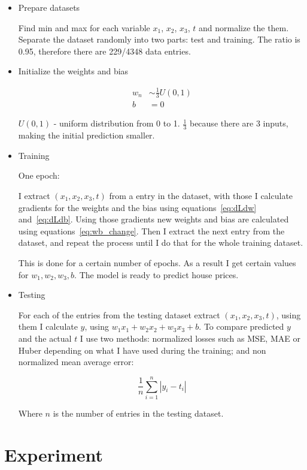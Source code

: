\documentclass{article}
\begin{document}
\begin{itemize}
    \item Prepare datasets

Find min and max for each variable $x_1$, $x_2$, $x_3$, $t$ and normalize the them.
Separate the dataset randomly into two parts: test and training. The ratio is
0.95, therefore there are 229/4348 data entries.


    \item Initialize the weights and bias

\[
\begin{split}
w_n &\sim \frac{1}{3} U(0, 1) \\
b &= 0
\end{split}
\]

$U(0, 1)$ - uniform distribution from 0 to 1. $\frac{1}{3}$ because there are
3 inputs, making the initial prediction smaller.


    \item Training


One epoch:

I extract $(x_1, x_2, x_3, t)$ from a entry in the dataset, with
those I calculate gradients for the weights and the bias
using equations~\ref{eq:dLdw} and~\ref{eq:dLdb}.
Using those gradients new weights and bias are calculated using
equations~\ref{eq:wb_change}. Then I extract the next entry from the dataset,
and repeat the process until I do that for the whole training dataset.

This is done for a certain number of epochs. As a result I get certain values for
$w_1, w_2, w_3, b$. The model is ready to predict house prices.


    \item Testing

For each of the entries from the testing dataset extract $(x_1, x_2, x_3, t)$,
using them I calculate $y$, using $w_1x_1 + w_2x_2 + w_3x_3 + b$. To compare
predicted $y$ and the actual $t$ I use two methods: normalized losses such as
MSE, MAE or Huber depending on what I have used during the training; and non
normalized mean average error:

\[
\frac{1}{n} \sum^{n}_{i=1} |y_i - t_i|
\]

Where $n$ is the number of entries in the testing dataset.


\end{itemize}


\section{Experiment}
\end{document}

